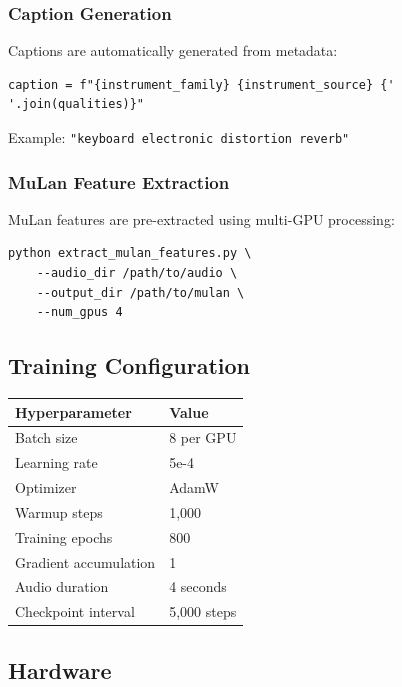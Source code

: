 \documentclass[11pt,a4paper]{article}
\begin{document}
\subsubsection{Caption Generation}

Captions are automatically generated from metadata:

\begin{verbatim}
caption = f"{instrument_family} {instrument_source} {' '.join(qualities)}"
\end{verbatim}

Example: \texttt{"keyboard electronic distortion reverb"}

\subsubsection{MuLan Feature Extraction}

MuLan features are pre-extracted using multi-GPU processing:

\begin{verbatim}
python extract_mulan_features.py \
    --audio_dir /path/to/audio \
    --output_dir /path/to/mulan \
    --num_gpus 4
\end{verbatim}

\subsection{Training Configuration}

\begin{table}[h]
\centering
\begin{tabular}{ll}
\toprule
\textbf{Hyperparameter} & \textbf{Value} \\
\midrule
Batch size & 8 per GPU \\
Learning rate & 5e-4 \\
Optimizer & AdamW \\
Warmup steps & 1,000 \\
Training epochs & 800 \\
Gradient accumulation & 1 \\
Audio duration & 4 seconds \\
Checkpoint interval & 5,000 steps \\
\bottomrule
\end{tabular}
\end{table}

\subsection{Hardware}
\end{document}
